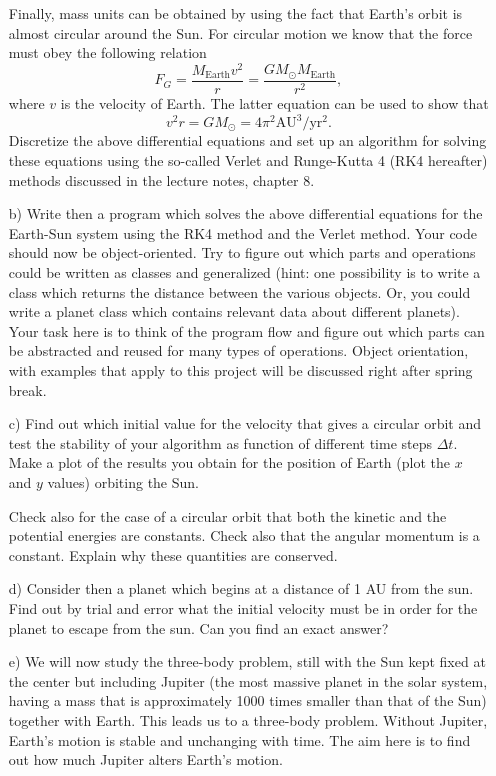 \documentclass[11pt,a4wide]{article}
\begin{document}
\begin{enumerate}
Finally,  mass units can be obtained by using the fact that Earth's orbit is almost circular around the Sun.
For circular motion we know that the force must obey the following relation
\[
F_G= \frac{M_{\mathrm{Earth}}v^2}{r}=\frac{GM_{\odot}M_{\mathrm{Earth}}}{r^2},
\]
where $v$ is the velocity of Earth. 
The latter equation can be used to show that
\[
v^2r=GM_{\odot}=4\pi^2\mathrm{AU}^3/\mathrm{yr}^2.
\]
Discretize the above differential equations and set up an algorithm for solving these equations using the so-called Verlet and
Runge-Kutta 4 (RK4 hereafter)  methods discussed in the lecture notes, chapter 8.
\item[b)]  Write then a program which solves the above differential equations for the Earth-Sun system
using the RK4 method and the Verlet method. 
Your code should now be object-oriented. Try to figure out which parts and operations could be written as classes
and generalized (hint: one possibility is to write a class which returns the distance between the various objects. Or, you could write a planet class which contains relevant data about different planets).  Your task here is to think of the program flow and figure out which parts can be abstracted and reused for many types of operations. Object orientation, with examples that apply to this project will be discussed right after spring break. 
\item[c)]
Find out which initial value for the velocity that gives a circular orbit
and test the stability of your algorithm as function of different time steps $\Delta t$. 
Make a plot of the results you obtain for the position of Earth (plot the $x$ and $y$ values) orbiting  the Sun.

Check also for the case of a circular orbit that both the kinetic and the potential energies are constants.
Check also that the angular momentum is a constant. Explain why these quantities
are conserved.


\item[d)] Consider then a planet which begins at a distance of 1 AU from the sun. Find out by trial and error
what the initial velocity must be in order for the planet to escape from the sun.  Can you find an exact answer?

\item[e)]  We will now study the three-body problem, still with the Sun kept fixed at the center but 
including Jupiter (the most massive planet in the solar system, having a mass that is approximately 1000 times
smaller than that of the Sun) together with Earth. This leads us to a three-body problem. Without Jupiter, Earth's motion is stable and unchanging with time. The aim here is to find out how much Jupiter alters Earth's motion.


\end{enumerate}
\end{document}

